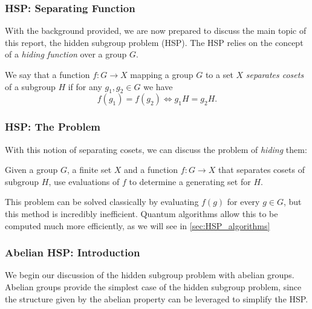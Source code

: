 \documentclass{beamer}
\begin{document}

\begin{frame}
\frametitle{HSP: Separating Function}\label{sec:HSP}
    With the background provided, we are now prepared to discuss the main topic of this report, the hidden subgroup problem (HSP).
    The HSP relies on the concept of a \textit{hiding function} over a group $G$.
    \begin{definition}\label{def:separating_function}
            We say that a function $f : G \to X$ mapping a group $G$ to a set $X$ \textit{separates cosets} of a subgroup $H$ if for any $g_1, g_2 \in G$ we have $$f(g_1) = f(g_2) \iff g_1 H = g_2 H.$$
        \end{definition}
\end{frame}

\begin{frame}
\frametitle{HSP: The Problem}
        With this notion of separating cosets, we can discuss the problem of \textit{hiding} them:
        \begin{problem}\label{problem:HSP}
            Given a group $G$, a finite set $X$ and a function $f: G \to X$ that separates cosets of subgroup $H$, use evaluations of $f$ to determine a generating set for $H$.
        \end{problem}
        This problem can be solved classically by evaluating $f(g)$ for every $g \in G$, but this method is incredibly inefficient.
        Quantum algorithms allow this to be computed much more efficiently, as we will see in \ref{sec:HSP_algorithms}
\end{frame}

\begin{frame}
\frametitle{Abelian HSP: Introduction}\label{HSP:abelian_HSP}
        We begin our discussion of the hidden subgroup problem with abelian groups.
        Abelian groups provide the simplest case of the hidden subgroup problem, since the structure given by the abelian property can be leveraged to simplify the HSP.
\end{frame}
\end{document}
